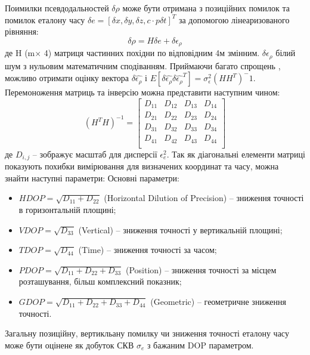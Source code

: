 Поимилки псевдодальностей $ \delta\rho $ може бути отримана з позиційних помилок 
 та помилок еталону часу $\delta e =[\delta x, \delta y, \delta z, c\cdot p\delta t]^T $
 за допомогою лінеаризованого рівняння:
\begin{equation}
\label{eq:sns_dop_err}
\delta \rho = H \delta e + \delta \epsilon_{\rho}
\end{equation}   
де H (m$\times$ 4) матриця частинних похідни по відповідним 4м змінним.
$\delta\epsilon_\rho$ білий шум з нульовим математичним сподіванням. Приймаючи
багато спрощень \cite{gps4}, можливо отримати оцінку вектора $\delta\hat{\epsilon_\rho}$ і
$E[\delta\hat{\epsilon_\rho} \delta\hat{\epsilon_\rho}^T] = \sigma_\epsilon^2(HH^T)^-1$.
Перемоноження матриць та інверсію можна представити наступним чином:  
\begin{equation}
\label{eq:sns_dop_matrix}
(H^{T}H)^{-1} = \left[
\begin{array}{cccc}
D_{11} & D_{12} & D_{13} & D_{14} \\
D_{21} & D_{22} & D_{23} & D_{24} \\
D_{31} & D_{32} & D_{33} & D_{34} \\
D_{41} & D_{42} & D_{43} & D_{44} \\
\end{array}\right]
\end{equation}   
де $D_{i,j}$ -- зображує масштаб для дисперсії $\epsilon^{2}_{e}$. Так як діагональні
елементи матриці показують похибки вимірювання для визначених координат та часу, можна знайти наступні
параметри:
Основні параметри:
\begin{itemize}
 \item $HDOP = \sqrt{D_{11}+D_{22}}$ (Horizontal Dilution of Precision) -- зниження точності в горизонтальній площині;
 \item $VDOP = \sqrt{D_{33}}$ (Vertical) -- зниження точності у вертикальній площині;
 \item $TDOP = \sqrt{D_{44}}$ (Time) -- зниження точності за часом;
 \item $PDOP = \sqrt{D_{11}+D_{22}+D_{33}}$ (Position) -- зниження точності за місцем розташування, більш комплексний показник;
 \item $GDOP = \sqrt{D_{11}+D_{22}+D_{33}+D_{44}}$ (Geometric) -- геометричне зниження точності.
\end{itemize}

Загальну позиційну, вертикльану помилку чи зниження точності еталону часу може бути оцінене як 
добуток СКВ $\sigma_{e}$ з бажаним DOP параметром.

